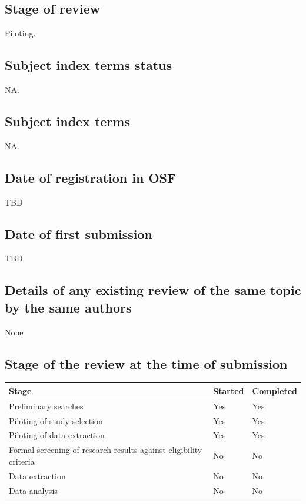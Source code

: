\documentclass{article}
\begin{document}
\subsection{Stage of review}
Piloting.

\subsection{Subject index terms status}
NA.

\subsection{Subject index terms}
NA.

\subsection{Date of registration in OSF}
TBD

\subsection{Date of first submission}
TBD

\subsection{Details of any existing review of the same topic by the same authors}
None

\subsection{Stage of the review at the time of submission}
\begin{longtable}{p{4.5cm}|p{3cm}|p{3cm}}
        \hline
         \textbf{Stage} & \textbf{Started} & \textbf{Completed}\\
         \hline
         Preliminary searches & Yes & Yes\\
        \hline
         Piloting of study selection & Yes & Yes\\
        \hline
        Piloting of data extraction & Yes & Yes\\
        \hline
         Formal screening of research results against eligibility criteria & No & No \\
        \hline
         Data extraction & No & No \\
        \hline
         Data analysis & No & No 
\label{tab:critApp}
\end{longtable}



\end{document}
